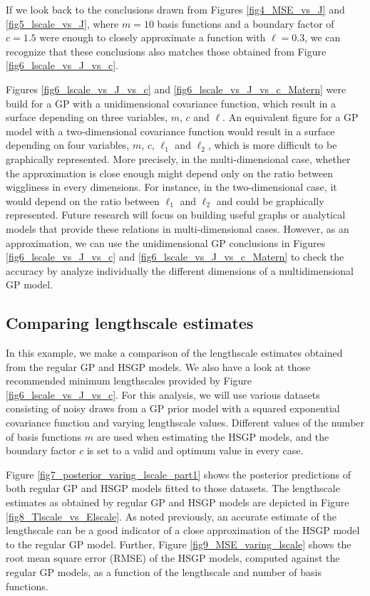 \documentclass[onecolumn,a4paper,11pt]{article}
\begin{document}
If we look back to the conclusions drawn from Figures \ref{fig4_MSE_vs_J} and \ref{fig5_lscale_vs_J}, where $m = 10$ basis functions and a boundary factor of $c = 1.5$ were enough to closely approximate a function with $\ell = 0.3$, we can recognize that these conclusions also matches those obtained from Figure \ref{fig6_lscale_vs_J_vs_c}.

Figures \ref{fig6_lscale_vs_J_vs_c} and \ref{fig6_lscale_vs_J_vs_c_Matern} were build for a GP with a unidimensional covariance function, which result in a surface depending on three variables, $m$, $c$ and $\ell$. An equivalent figure for a GP model with a two-dimensional covariance function would result in a surface depending on four variables, $m$, $c$, $\ell_1$ and $\ell_2$, which is more difficult to be graphically represented. More precisely, in the multi-dimensional case, whether the approximation is close enough might depend only on the ratio between wiggliness in every dimensions. For instance, in the two-dimensional case, it would depend on the ratio between $\ell_1$ and $\ell_2$ and could be graphically represented. Future research will focus on building useful graphs or analytical models that provide these relations in multi-dimensional cases. However, as an approximation, we can use the unidimensional GP conclusions in Figures \ref{fig6_lscale_vs_J_vs_c} and \ref{fig6_lscale_vs_J_vs_c_Matern} to check the accuracy by analyze individually the different dimensions of a multidimensional GP model.

\subsection{Comparing lengthscale estimates}

In this example, we make a comparison of the lengthscale estimates
obtained from the regular GP and HSGP models. We also have a look at those recommended minimum lengthscales provided by Figure \ref{fig6_lscale_vs_J_vs_c}.
For this analysis, we will use various datasets consisting of noisy draws from a GP prior model with a squared exponential covariance function and varying lengthscale values. Different values of the number of basis functions $m$ are used when estimating the HSGP models, and the boundary factor $c$ is set to a valid and optimum value in every case. 

Figure \ref{fig7_posterior_varing_lscale_part1} shows the posterior predictions of both regular GP and HSGP models fitted to those datasets. The lengthscale estimates as obtained by regular GP and HSGP models are depicted in Figure \ref{fig8_Tlscale_vs_Elscale}. As noted previously, an accurate estimate of the lengthscale can be a good indicator of a close approximation of the HSGP model to the regular GP model. Further, Figure \ref{fig9_MSE_varing_lscale} shows the root mean square error (RMSE) of the HSGP models, computed against the regular GP models, as a function of the lengthscale and number of basis functions.
\end{document}

